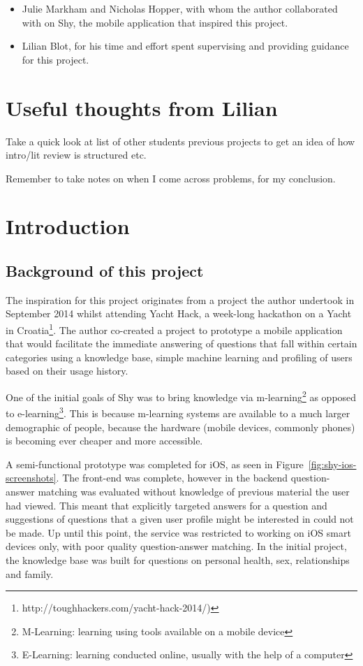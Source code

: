 \documentclass{article}
\begin{document}
\begin{itemize}
  \item Julie Markham and Nicholas Hopper, with whom the author collaborated with on Shy, the mobile application that inspired this project.
  \item Lilian Blot, for his time and effort spent supervising and providing guidance for this project.
\end{itemize}


\newpage
\section{Useful thoughts from Lilian}
Take a quick look at list of other students previous projects to get an idea of how intro/lit review is structured etc.

Remember to take notes on when I come across problems, for my conclusion.

\newpage
\section{Introduction}

\subsection{Background of this project}

The inspiration for this project originates from a project the author undertook in September 2014 whilst attending Yacht Hack, a week-long hackathon on a Yacht in Croatia\footnote{http://toughhackers.com/yacht-hack-2014/)}.  The author co-created a project to prototype a mobile application that would facilitate the immediate answering of questions that fall within certain categories using a knowledge base, simple machine learning and profiling of users based on their usage history.

One of the initial goals of Shy was to bring knowledge via m-learning\footnote{M-Learning: learning using tools available on a mobile device} as opposed to e-learning\footnote{E-Learning: learning conducted online, usually with the help of a computer}.  This is because m-learning systems are available to a much larger demographic of people, because the hardware (mobile devices, commonly phones) is becoming ever cheaper and more accessible.

A semi-functional prototype was completed for iOS, as seen in Figure~\ref{fig:shy-ios-screenshots}.  The front-end was complete, however in the backend question-answer matching was evaluated without knowledge of previous material the user had viewed.  This meant that explicitly targeted answers for a question and suggestions of questions that a given user profile might be interested in could not be made.  Up until this point, the service was restricted to working on iOS smart devices only, with poor quality question-answer matching.  In the initial project, the knowledge base was built for questions on personal health, sex, relationships and family.
\end{document}

